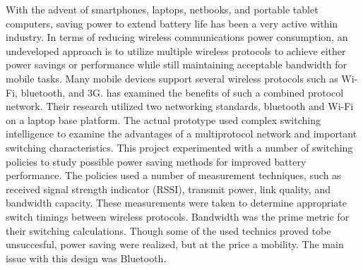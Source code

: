 \documentclass[conference]{IEEEtran}
\begin{document}
With the advent of smartphones, laptops, netbooks, and portable tablet computers, saving power to extend battery life has been a very active within industry. In terms of reducing wireless communications power consumption, an undeveloped approach is to utilize multiple wireless protocols to achieve either power savings or performance while still maintaining acceptable bandwidth for mobile tasks.  Many mobile devices support several wireless protocols such as Wi-Fi, bluetooth, and 3G.  \cite{six} has examined the benefits of such a combined protocol network.  Their research utilized two networking standards, bluetooth and Wi-Fi on a laptop base platform.  The actual prototype used complex switching intelligence to examine the advantages of a multiprotocol network and important switching characteristics.  This project experimented with a number of switching policies to study possible power saving methods for improved battery performance.  The policies used a number of measurement techniques, such as received signal strength indicator (RSSI), transmit power, link quality, and bandwidth capacity.  These measurements were taken to determine appropriate switch timings between wireless protocols\cite{six}.  Bandwidth was the prime metric for their switching calculations.  Though some of the used technics proved tobe unsuccesful, power saving were realized, but at the price a mobility. The main issue with this design was Bluetooth.
\end{document}

